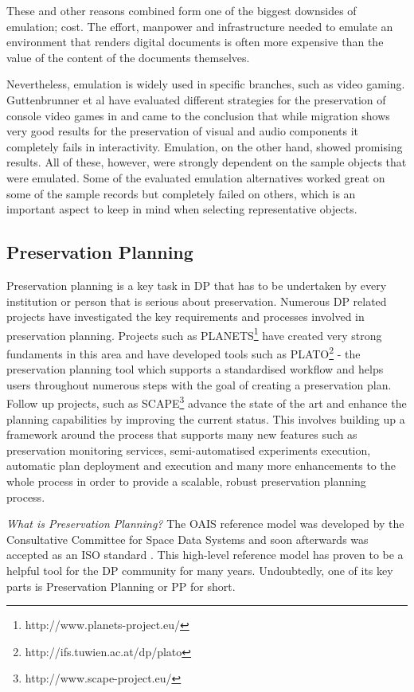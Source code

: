 These and other reasons combined form one of the biggest downsides of emulation; cost. The effort, manpower and infrastructure needed to emulate an environment that renders digital documents is often more expensive than the value of the content of the documents themselves.

Nevertheless, emulation is widely used in specific branches, such as video gaming.
Guttenbrunner et al have evaluated different strategies for the preservation of console video games in \cite{guttenbrunner:2008:evaluating} and came to the conclusion that while migration shows very good results for the preservation of visual and audio components it completely fails in interactivity. Emulation, on the other hand, showed promising results. All of these, however, were strongly dependent on the sample objects that were emulated. Some of the evaluated emulation alternatives worked great on some of the sample records but completely failed on others, which is an important aspect to keep in mind when selecting representative objects.

\subsection{Preservation Planning}
Preservation planning is a key task in DP that has to be undertaken by every institution or person that is serious about preservation. Numerous DP related projects have investigated the key requirements and processes involved in preservation planning. Projects such as PLANETS\footnote{http://www.planets-project.eu/} have created very strong fundaments in this area and have developed tools such as PLATO\footnote{http://ifs.tuwien.ac.at/dp/plato} - the preservation planning tool which supports a standardised workflow and helps users throughout numerous steps with the goal of creating a preservation plan. Follow up projects, such as SCAPE\footnote{http://www.scape-project.eu/} advance the state of the art and enhance the planning capabilities by improving the current status. This involves building up a framework around the process that supports many new features such as preservation monitoring services, semi-automatised experiments execution, automatic plan deployment and execution and many more enhancements to the whole process in order to provide a scalable, robust preservation planning process.\newline

\noindent\textit{What is Preservation Planning?}\newline
The OAIS reference model was developed by the Consultative Committee for Space Data Systems and soon afterwards was accepted as an ISO standard \cite{iso:2003:oais}. This high-level reference model has proven to be a helpful tool for the DP community for many years. Undoubtedly, one of its key parts is Preservation Planning or PP for short.


